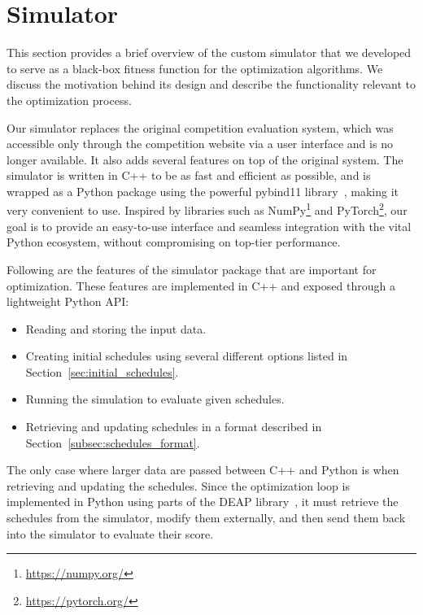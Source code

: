 \section{Simulator} \label{sec:simulator}

This section provides a brief overview of the custom simulator that we developed to serve as a black-box fitness function for the optimization algorithms. We discuss the motivation behind its design and describe the functionality relevant to the optimization process.

\medskip

Our simulator replaces the original competition evaluation system, which was accessible only through the competition website via a user interface and is no longer available. It also adds several features on top of the original system.
The simulator is written in C++ to be as fast and efficient as possible, and is wrapped as a Python package using the powerful pybind11 library~\cite{jakob2017pybind11}, making it very convenient to use.
Inspired by libraries such as NumPy\footnote{\url{https://numpy.org/}} and PyTorch\footnote{\url{https://pytorch.org/}}, our goal is to provide an easy-to-use interface and seamless integration with the vital Python ecosystem, without compromising on top-tier performance.

Following are the features of the simulator package that are important for optimization. These features are implemented in C++ and exposed through a lightweight Python API:
\begin{itemize}
    \item Reading and storing the input data.
    \item Creating initial schedules using several different options listed in Section~\ref{sec:initial_schedules}.
    \item Running the simulation to evaluate given schedules.
    \item Retrieving and updating schedules in a format described in Section~\ref{subsec:schedules_format}.
\end{itemize}

The only case where larger data are passed between C++ and Python is when retrieving and updating the schedules.
Since the optimization loop is implemented in Python using parts of the DEAP library~\cite{fortin2012deap}, it must retrieve the schedules from the simulator, modify them externally, and then send them back into the simulator to evaluate their score.
